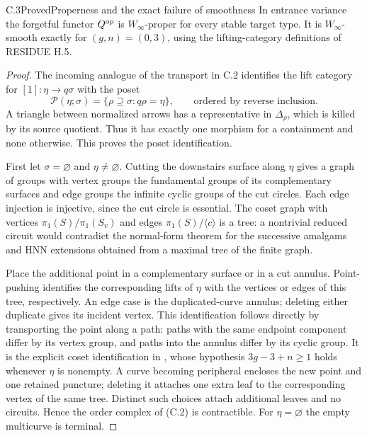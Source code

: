 \begin{result}{C.3}{Proved}{Properness and the exact failure of smoothness}
In entrance variance the forgetful functor $Q^{\mathrm{op}}$ is $W_\infty$-proper for every stable target type. It is $W_\infty$-smooth exactly for $(g,n)=(0,3)$, using the lifting-category definitions of RESIDUE H.5.
\end{result}
\begin{proof}
The incoming analogue of the transport in C.2 identifies the lift category for $[1]:\eta\to q\sigma$ with the poset
\[
 \mathcal P(\eta;\sigma)=\{\rho\supseteq\sigma:q\rho=\eta\},
 \qquad\text{ordered by reverse inclusion}.                    \tag{C.2}
\]
A triangle between normalized arrows has a representative in $\Delta_\rho$, which is killed by its source quotient. Thus it has exactly one morphism for a containment and none otherwise. This proves the poset identification.

First let $\sigma=\varnothing$ and $\eta\ne\varnothing$. Cutting the downstairs surface along $\eta$ gives a graph of groups with vertex groups the fundamental groups of its complementary surfaces and edge groups the infinite cyclic groups of the cut circles. Each edge injection is injective, since the cut circle is essential. The coset graph with vertices $\pi_1(S)/\pi_1(S_v)$ and edges $\pi_1(S)/\langle c\rangle$ is a tree: a nontrivial reduced circuit would contradict the normal-form theorem for the successive amalgams and HNN extensions obtained from a maximal tree of the finite graph.

Place the additional point in a complementary surface or in a cut annulus. Point-pushing identifies the corresponding lifts of $\eta$ with the vertices or edges of this tree, respectively. An edge case is the duplicated-curve annulus; deleting either duplicate gives its incident vertex. This identification follows directly by transporting the point along a path: paths with the same endpoint component differ by its vertex group, and paths into the annulus differ by its cyclic group. It is the explicit coset identification in \citet[Theorem 7.1 and \S7.2]{KentLeiningerSchleimer2009}, whose hypothesis $3g-3+n\geq1$ holds whenever $\eta$ is nonempty. A curve becoming peripheral encloses the new point and one retained puncture; deleting it attaches one extra leaf to the corresponding vertex of the same tree. Distinct such choices attach additional leaves and no circuits. Hence the order complex of (C.2) is contractible. For $\eta=\varnothing$ the empty multicurve is terminal.


\end{proof}
